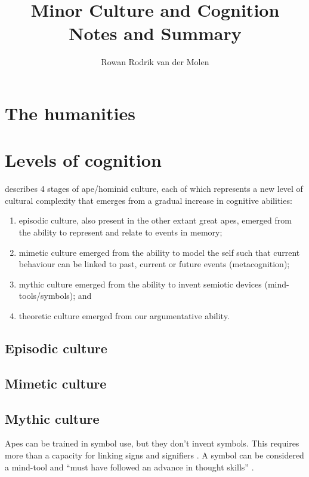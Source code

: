 \documentclass{article}
\title{Minor Culture and Cognition\\Notes and Summary}
\author{Rowan Rodrik van der Molen}
\begin{document}
\maketitle

\tableofcontents

\section{The humanities}

\citet{mesoudi2006}

\section{Levels of cognition}

\citet{donald1991} describes 4 stages of ape/hominid culture, each of which represents a new level of cultural complexity that emerges from a gradual increase in cognitive abilities:

\begin{enumerate}
\item episodic culture, also present in the other extant great apes, emerged from the ability to represent and relate to events in memory;
\item mimetic culture emerged from the ability to model the self such that current behaviour can be linked to past, current or future events (metacognition);
\item mythic culture emerged from the ability to invent semiotic devices (mind-tools/symbols); and
\item theoretic culture emerged from our argumentative ability.
\end{enumerate}

\subsection{Episodic culture}


\subsection{Mimetic culture}

\subsection{Mythic culture}

Apes can be trained in symbol use, but they don't invent symbols. This requires more than a capacity for linking signs and signifiers \citep[p.~217-220]{donald1991}. A symbol can be considered a mind-tool \citep{gregory1981} and ``must have followed an advance in thought skills'' \citep[p.219]{donald1991}.
\end{document}
